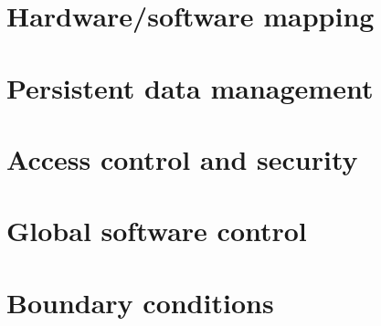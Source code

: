 \documentclass[a4paper,12pt]{article}
\begin{document}
    \section{Hardware/software mapping}


    \section{Persistent data management} %


    \section{Access control and security} %


    \section{Global software control} %


    \section{Boundary conditions} %
\end{document}
